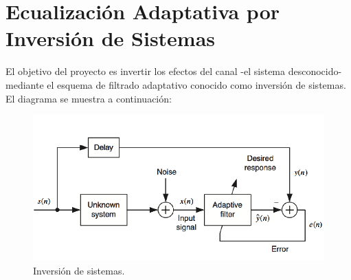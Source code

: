 \documentclass[main.tex]{subfiles}
\begin{document}
\section{Ecualización Adaptativa por Inversión de Sistemas}

El objetivo del proyecto es invertir los efectos del canal 
-el sistema desconocido- mediante el esquema de filtrado
adaptativo conocido como inversión de sistemas. El diagrama se muestra 
a continuación:

\begin{figure}[h]
    \centering
    \includegraphics[scale=0.5]{imagenes/block.PNG}
    \caption{Inversión de sistemas.}
\end{figure}
\end{document}
